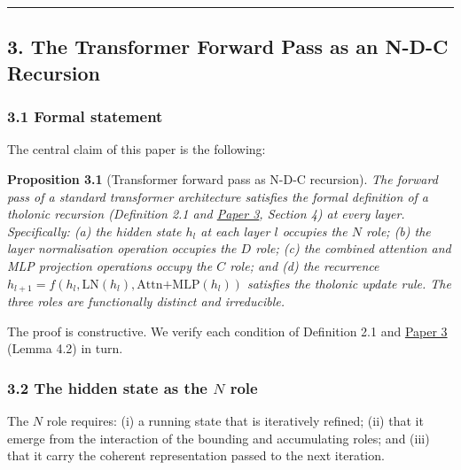 \documentclass[
  11pt,
  letterpaper,
]{article}
\begin{document}
\begin{center}\rule{0.5\linewidth}{0.5pt}\end{center}

\subsection{3. The Transformer Forward Pass as an N-D-C
Recursion}\label{the-transformer-forward-pass-as-an-n-d-c-recursion}

\subsubsection{3.1 Formal statement}\label{formal-statement}

The central claim of this paper is the following:

\textbf{Proposition 3.1} (Transformer forward pass as N-D-C recursion).
\emph{The forward pass of a standard transformer architecture satisfies
the formal definition of a tholonic recursion (Definition 2.1 and
\href{https://github.com/baardev/truevalue/blob/main/docnav/Research/papers/3_minimal-recursive-triadic-framework/3_minimal-recursive-triadic-framework.pdf}{Paper
3}, Section 4) at every layer. Specifically: (a) the hidden state
\(h_l\) at each layer \(l\) occupies the \(N\) role; (b) the layer
normalisation operation occupies the \(D\) role; (c) the combined
attention and MLP projection operations occupy the \(C\) role; and (d)
the recurrence
\(h_{l+1} = f(h_l, \text{LN}(h_l), \text{Attn+MLP}(h_l))\) satisfies the
tholonic update rule. The three roles are functionally distinct and
irreducible.}

The proof is constructive. We verify each condition of Definition 2.1
and
\href{https://github.com/baardev/truevalue/blob/main/docnav/Research/papers/3_minimal-recursive-triadic-framework/3_minimal-recursive-triadic-framework.pdf}{Paper
3} (Lemma 4.2) in turn.

\subsubsection{\texorpdfstring{3.2 The hidden state as the \(N\)
role}{3.2 The hidden state as the N role}}\label{the-hidden-state-as-the-n-role}

The \(N\) role requires: (i) a running state that is iteratively
refined; (ii) that it emerge from the interaction of the bounding and
accumulating roles; and (iii) that it carry the coherent representation
passed to the next iteration.
\end{document}

